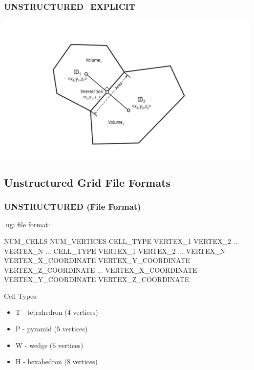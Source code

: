 \documentclass{beamer}
\begin{document}
\begin{frame}[fragile]\frametitle{UNSTRUCTURED\_EXPLICIT}
\vspace{0.2in}
\centering
\includegraphics[width=0.9\linewidth]{./voronoi_dual}
\end{frame}

\subsection{Unstructured Grid File Formats}

\begin{frame}\frametitle{UNSTRUCTURED (File Format)}
.ugi file format:
\small
\begin{semiverbatim}
NUM_CELLS NUM_VERTICES
CELL_TYPE VERTEX_1 VERTEX_2 ... VERTEX_N
...
CELL_TYPE VERTEX_1 VERTEX_2 ... VERTEX_N
VERTEX_X_COORDINATE VERTEX_Y_COORDINATE VERTEX_Z_COORDINATE
...
VERTEX_X_COORDINATE VERTEX_Y_COORDINATE VERTEX_Z_COORDINATE
\end{semiverbatim}

Cell Types:
\begin{itemize}
\item T - tetrahedron (4 vertices)
\item P - pyramid (5 vertices)
\item W - wedge (6 vertices)
\item H - hexahedron (8 vertices)
\end{itemize}
\end{frame}
\end{document}
